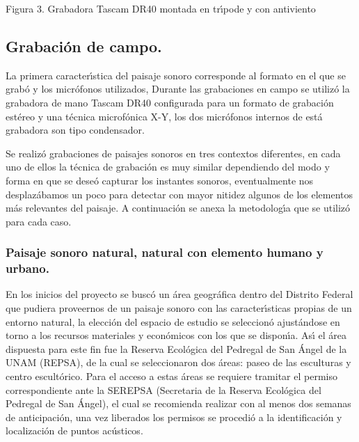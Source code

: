 \begin{center}
Figura 3. Grabadora Tascam DR40 montada en tr\'{\i}pode y con antiviento
\end{center}

\subsection{Grabaci\'{o}n de campo.}

La primera caracter\'{\i}stica del paisaje sonoro corresponde al formato en el
que se grab\'{o} y los micr\'{o}fonos utilizados, Durante las grabaciones en
campo se utiliz\'{o} la grabadora de mano Tascam DR40 configurada para un
formato de grabaci\'{o}n est\'{e}reo y una t\'{e}cnica microf\'{o}nica X-Y,
los dos micr\'{o}fonos internos de est\'{a} grabadora son tipo condensador.

Se realiz\'{o} grabaciones de paisajes sonoros en tres contextos diferentes,
en cada uno de ellos la t\'{e}cnica de grabaci\'{o}n es muy similar
dependiendo del modo y forma en que se dese\'{o} capturar los instantes
sonoros, eventualmente nos desplaz\'{a}bamos un poco para detectar con mayor
nitidez algunos de los elementos m\'{a}s relevantes del paisaje. A
continuaci\'{o}n se anexa la metodolog\'{\i}a que se utiliz\'{o} para cada caso.

\subsubsection{Paisaje sonoro natural, natural con elemento humano
y urbano.}

En los inicios del proyecto se busc\'{o} un \'{a}rea geogr\'{a}fica dentro del
Distrito Federal que pudiera proveernos de un paisaje sonoro con las
caracter\'{\i}sticas propias de un entorno natural, la elecci\'{o}n del
espacio de estudio se seleccion\'{o} ajust\'{a}ndose en torno a los recursos
materiales y econ\'{o}micos con los que se dispon\'{\i}a. As\'{\i} el \'{a}rea
dispuesta para este fin fue la Reserva Ecol\'{o}gica del Pedregal de San
\'{A}ngel de la UNAM (REPSA), de la cual se seleccionaron dos \'{a}reas: paseo
de las esculturas y centro escult\'{o}rico. Para el acceso a estas \'{a}reas
se requiere tramitar el permiso correspondiente ante la SEREPSA (Secretaria de
la Reserva Ecol\'{o}gica del Pedregal de San \'{A}ngel), el cual se recomienda
realizar con al menos dos semanas de anticipaci\'{o}n, una vez liberados los
permisos se procedi\'{o} a la identificaci\'{o}n y localizaci\'{o}n de puntos ac\'{u}sticos.

